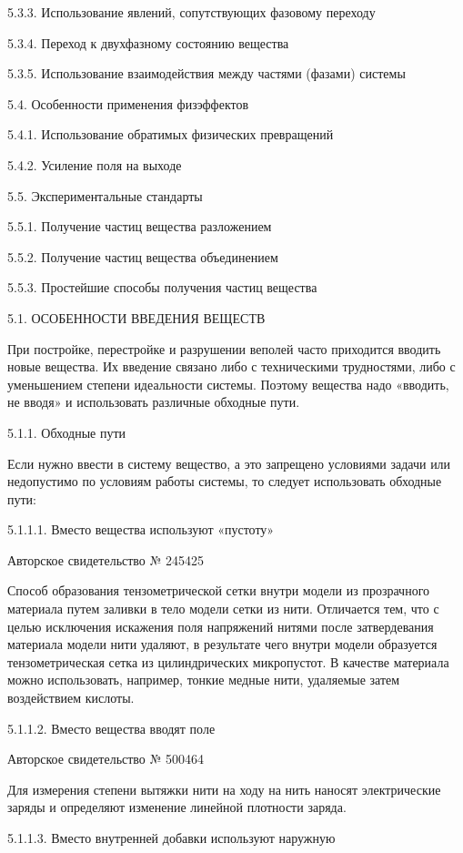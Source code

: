 5.3.3. Использование явлений, сопутствующих фазовому
переходу

5.3.4. Переход к двухфазному состоянию вещества


5.3.5. Использование взаимодействия между частями
(фазами) системы

5.4. Особенности применения физэффектов

5.4.1. Использование обратимых физических
превращений

5.4.2. Усиление поля на выходе

5.5. Экспериментальные стандарты

5.5.1. Получение частиц вещества разложением

5.5.2. Получение частиц вещества объединением

5.5.3. Простейшие способы получения частиц вещества


5.1. ОСОБЕННОСТИ ВВЕДЕНИЯ ВЕЩЕСТВ

При  постройке,  перестройке  и разрушении  веполей  часто  приходится
вводить  новые  вещества.  Их  введение связано  либо  с  техническими
трудностями, либо  с уменьшением степени идеальности  системы. Поэтому
вещества надо  «вводить, не  вводя» и использовать  различные обходные
пути.


5.1.1. Обходные пути

Если нужно ввести в систему вещество, а это запрещено условиями задачи
или недопустимо  по условиям  работы системы, то  следует использовать
обходные пути:


5.1.1.1. Вместо вещества используют «пустоту»


Авторское свидетельство № 245425

Способ образования тензометрической сетки внутри модели из прозрачного
материала  путем  заливки в  тело  модели  сетки из  нити.  Отличается
тем, что  с целью  исключения искажения  поля напряжений  нитями после
затвердевания  материала  модели  нити   удаляют,  в  результате  чего
внутри  модели  образуется  тензометрическая сетка  из  цилиндрических
микропустот. В качестве материала можно использовать, например, тонкие
медные нити, удаляемые затем воздействием кислоты.


5.1.1.2. Вместо вещества вводят поле


Авторское свидетельство № 500464

Для  измерения   степени  вытяжки  нити   на  ходу  на   нить  наносят
электрические заряды и определяют изменение линейной плотности заряда.


5.1.1.3. Вместо внутренней добавки используют наружную

